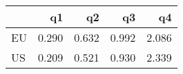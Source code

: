 \begin{tabular}{lrrrr}
\toprule
{} &     q1 &     q2 &     q3 &     q4 \\
\midrule
EU &  0.290 &  0.632 &  0.992 &  2.086 \\
US &  0.209 &  0.521 &  0.930 &  2.339 \\
\bottomrule
\end{tabular}
